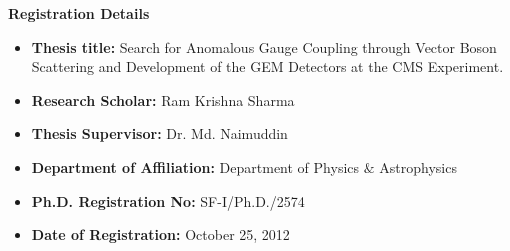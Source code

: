 \documentclass[twoside,openright,titlepage,numbers=noenddot,headinclude,%
               footinclude=true,cleardoublepage=empty,abstractoff,BCOR=5mm,%
               paper=a4,fontsize=12pt]{book}
\begin{document}





\pagebreak
\begin{center}
  \textbf{\large{Registration Details}}
  \begin{itemize}
  \item \textbf{Thesis title:} Search for Anomalous Gauge Coupling through Vector Boson Scattering and Development of the GEM Detectors at the CMS Experiment.
  \item \textbf{Research Scholar:} Ram Krishna Sharma
  \item \textbf{Thesis Supervisor:} Dr. Md. Naimuddin
  \item \textbf{Department of Affiliation:} Department of Physics $\&$ Astrophysics
  \item \textbf{Ph.D. Registration No:} SF-I/Ph.D./2574
   \item \textbf{Date of Registration:} October 25, 2012
  \end{itemize}
\end{center}

  \printbibliography
\end{document}
